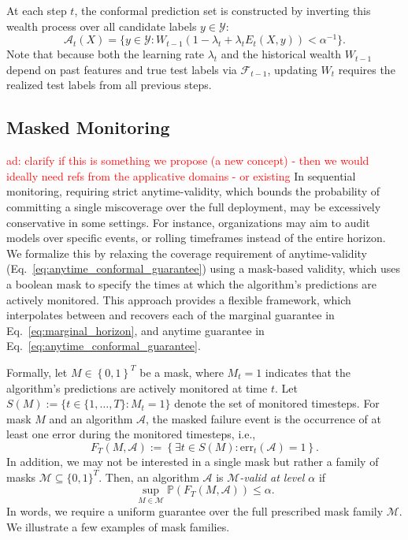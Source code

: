 \documentclass{uai2026} %
\newcommand{\1}{\mathbf{1}}
\newcommand{\prob}{\mathbb{P}}
\newcommand{\ycal}{\mathcal{Y}}
\newcommand{\ens}[1]{\left\{#1\right\}}
\newcommand{\err}{\mathrm{err}}
\newcommand{\F}{\mathcal{F}}
\newcommand{\mcal}{\mathcal{M}}
\newcommand{\acal}{\mathcal{A}}
\newcommand{\aymeric}[1]{\textcolor{red}{ad: #1}}
\begin{document}
At each step $t$, the conformal prediction set is constructed by inverting this wealth process over all candidate labels $y \in \ycal$:
\begin{equation*}
  \acal_t(X) = \{y \in \ycal \colon W_{t-1} (1 - \lambda_t + \lambda_t E_t(X, y)) < \alpha^{-1}\}.
\end{equation*}
Note that because both the learning rate $\lambda_t$ and the historical wealth $W_{t-1}$ depend on past features and true test labels via $\F_{t-1}$, updating $W_t$ requires the realized test labels from all previous steps.

\subsection{Masked Monitoring}
\aymeric{clarify if this is something we propose (a new concept) - then we would ideally need refs from the applicative domains - or existing}
In sequential monitoring, requiring strict anytime-validity, which bounds the probability of committing a single miscoverage over the full deployment, may be excessively conservative in some settings. For instance, organizations may aim to audit models over specific events, or rolling timeframes instead of the entire horizon. We formalize this by relaxing the coverage requirement of anytime-validity (Eq.~\ref{eq:anytime_conformal_guarantee}) using a mask-based validity, which uses a boolean mask to specify the times at which the algorithm's predictions are actively monitored. This approach provides a flexible framework, which interpolates between and recovers each of the marginal guarantee in Eq.~\ref{eq:marginal_horizon}, and anytime guarantee in Eq.~\ref{eq:anytime_conformal_guarantee}.

Formally, let $M\in \ens{0,1}^T$ be a mask, where $M_t=1$ indicates that the algorithm's predictions are actively monitored at time $t$. Let $S(M) := \{t \in \{1,\dots,T\} \colon M_t=1\}$ denote the set of monitored timesteps. For mask $M$ and an algorithm $\acal$, the masked failure event is the occurrence of at least one error during the monitored timesteps, i.e.,
\begin{equation}
  \label{eq:mask_valid_norestart}
  F_T(M, \acal):=\left\{\exists t\in S(M)\colon \err_t(\acal) = 1\right\}.
\end{equation}
In addition, we may not be interested in a single mask but rather a family of masks $\mcal \subseteq\{0,1\}^T$. Then, an algorithm $\acal$ is \emph{$\mcal$-valid at level $\alpha$} if
\begin{equation*}
  \sup_{M\in\mcal}\prob(F_T(M, \acal))\le\alpha.
\end{equation*}
In words, we require a uniform guarantee over the full prescribed mask family $\mcal$. We illustrate a few examples of mask families.
\end{document}
